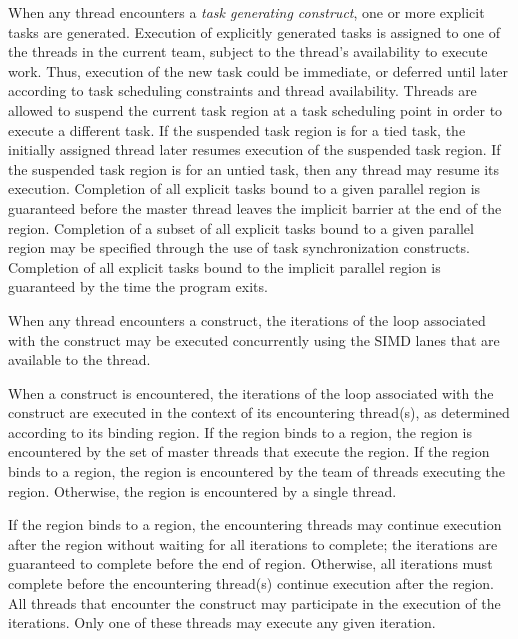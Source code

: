 When any thread encounters a \emph{task generating construct}, one or more explicit tasks are generated.
Execution of explicitly generated tasks is assigned to one of the threads in the current
team, subject to the thread's availability to execute work. Thus, execution of the new
task could be immediate, or deferred until later according to task scheduling constraints
and thread availability. Threads are allowed to suspend the current task region at a task
scheduling point in order to execute a different task. If the suspended task region is for
a tied task, the initially assigned thread later resumes execution of the suspended task
region. If the suspended task region is for an untied task, then any thread may resume its
execution. Completion of all explicit tasks bound to a given parallel region is guaranteed
before the master thread leaves the implicit barrier at the end of the region. Completion
of a subset of all explicit tasks bound to a given parallel region may be specified through
the use of task synchronization constructs. Completion of all explicit tasks bound to the
implicit parallel region is guaranteed by the time the program exits.

When any thread encounters a  construct, the iterations of the loop associated with
the construct may be executed concurrently using the SIMD lanes that are available to
the thread.

When a  construct is encountered, the iterations of the loop
associated with the construct are executed in the context of its encountering
thread(s), as determined according to its binding region. If the 
region binds to a  region, the region is encountered by the set
of master threads that execute the  region. If the 
region binds to a  region, the region is encountered by the team
of threads executing the  region. Otherwise, the region is
encountered by a single thread.

If the  region binds to a  region, the encountering
threads may continue execution after the  region without waiting
for all iterations to complete; the iterations are guaranteed to complete
before the end of  region.  Otherwise, all iterations must
complete before the encountering thread(s) continue execution after the
 region. All threads that encounter the  construct may
participate in the execution of the iterations. Only one of these threads may
execute any given iteration.

